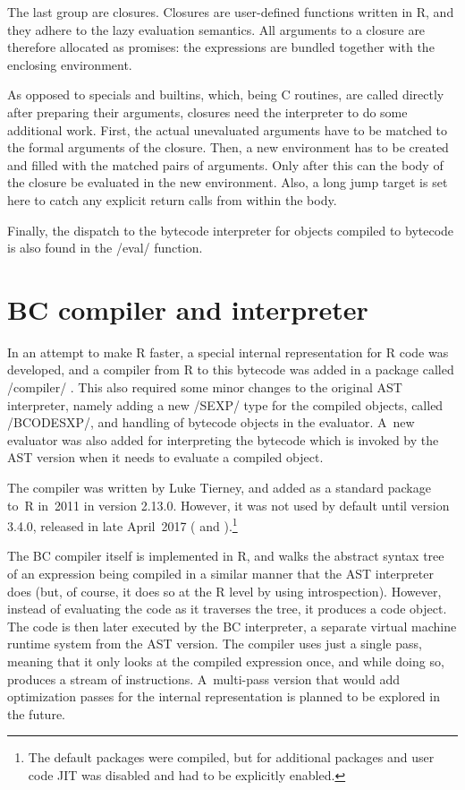 {The last group are closures. Closures are user-defined functions written in R, and they adhere to the lazy evaluation semantics. All arguments to a closure are therefore allocated as promises: the expressions are bundled together with the enclosing environment.

As opposed to specials and builtins, which, being C routines, are called directly after preparing their arguments, closures need the interpreter to do some additional work. First, the actual unevaluated arguments have to be matched to the formal arguments of the closure. Then, a new environment has to be created and filled with the matched pairs of arguments. Only after this can the body of the closure be evaluated in the new environment. Also, a long jump target is set here to catch any explicit return calls from within the body.

Finally, the dispatch to the bytecode interpreter for objects compiled to bytecode is also found in the \cinline/eval/ function.


\section{BC compiler and interpreter}

In an attempt to make R faster, a special internal representation for R code was developed, and a compiler from R to this bytecode was added in a package called \rinline/compiler/ \autocite{compiler}. This also required some minor changes to the original AST interpreter, namely adding a new \cinline/SEXP/ type for the compiled objects, called \cinline/BCODESXP/, and handling of bytecode objects in the evaluator. A~new evaluator was also added for interpreting the bytecode which is invoked by the AST version when it needs to evaluate a compiled object.

The compiler was written by Luke Tierney, and added as a standard package to~R in~2011 in version 2.13.0. However, it was not used by default until version 3.4.0, released in late April~2017 (\autocite{announce2011} and \autocite{announce2017}).\footnote{The default packages were compiled, but for additional packages and user code JIT was disabled and had to be explicitly enabled.}

The BC compiler itself is implemented in R, and walks the abstract syntax tree of an expression being compiled in a similar manner that the AST interpreter does (but, of course, it does so at the R level by using introspection). However, instead of evaluating the code as it traverses the tree, it produces a code object. The code is then later executed by the BC interpreter, a separate virtual machine runtime system from the AST version. The compiler uses just a single pass, meaning that it only looks at the compiled expression once, and while doing so, produces a stream of instructions. A~multi-pass version that would add optimization passes for the internal representation is planned to be explored in the future.

}
